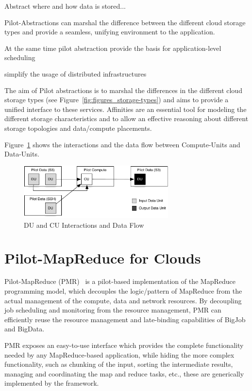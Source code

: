 \documentclass[times]{cpeauth}
\newcommand{\computeunits}{Compute-Units\xspace}
\newcommand{\dataunits}{Data-Units\xspace}
\begin{document}
Abstract where and how data is stored...

Pilot-Abstractions can marshal the difference between the different cloud storage types and provide a seamless, unifying environment to the application.

At the same time pilot abstraction provide the basis for application-level 
scheduling

simplify the usage of distributed infrastructures





The aim of Pilot abstractions is to marshal the differences in the different 
cloud storage types (see Figure~\ref{fig:figures_storage-types}) and aims to 
provide a unified interface to these services. Affinities are an essential 
tool for modeling the different storage characteristics and to allow an 
effective reasoning about different storage topologies and data/compute 
placements.


Figure~\ref{fig:figures_data-flow} shows the interactions and the data flow 
between \computeunits and \dataunits.
\begin{figure}[htbp]
	\centering
		\includegraphics[width=0.7\textwidth]{figures/data-flow.pdf}
	\caption{DU and CU Interactions and Data Flow}
	\label{fig:figures_data-flow}
\end{figure}



\section{Pilot-MapReduce for Clouds}

Pilot-MapReduce (PMR)~\cite{Mantha:2012:PEF:2287016.2287020} is a pilot-based
implementation of the MapReduce programming model, which decouples the
logic/pattern of MapReduce from the actual management of the compute, data and
network resources. By decoupling job scheduling and monitoring from the
resource management, PMR can efficiently reuse the resource management and
late-binding capabilities of BigJob and BigData.

PMR exposes an easy-to-use interface which provides the complete
functionality needed by any MapReduce-based application, while hiding
the more complex functionality, such as chunking of the input, sorting
the intermediate results, managing and coordinating the map and reduce
tasks, etc., these are generically implemented by the
framework.
\end{document}
